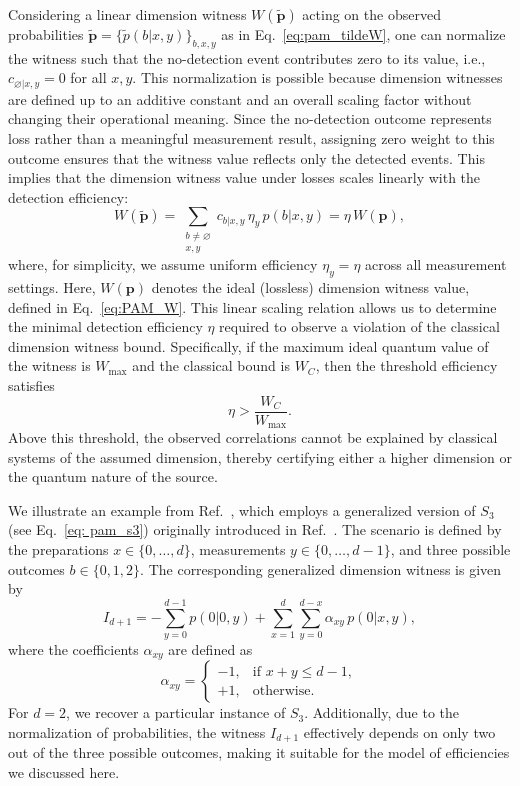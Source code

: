 \documentclass[aps,pra,reprint, superscriptaddress,showkeys]{revtex4-2}
\theoremstyle{plain}
\begin{document}
Considering a linear dimension witness \(W(\mathbf{\tilde{p}})\) acting on the observed probabilities \(\mathbf{\tilde{p}} = \{\tilde{p}(b|x,y)\}_{b,x,y}\) as in Eq.~\eqref{eq:pam_tildeW}, one can normalize the witness such that the no-detection event contributes zero to its value, i.e., \(c_{\varnothing|x,y} = 0\) for all \(x,y\). This normalization is possible because dimension witnesses are defined up to an additive constant and an overall scaling factor without changing their operational meaning. Since the no-detection outcome represents loss rather than a meaningful measurement result, assigning zero weight to this outcome ensures that the witness value reflects only the detected events. This implies that the dimension witness value under losses scales linearly with the detection efficiency:
\begin{equation}
    W(\mathbf{\tilde{p}}) = \sum_{\substack{b \neq \varnothing \\ x,y}} c_{b|x,y} \, \eta_y \, p(b|x,y) = \eta\, W(\mathbf{p}),
\end{equation}
where, for simplicity, we assume uniform efficiency \(\eta_y = \eta\) across all measurement settings. Here, \(W(\mathbf{p})\) denotes the ideal (lossless) dimension witness value, defined in Eq.~\eqref{eq:PAM_W}. This linear scaling relation allows us to determine the minimal detection efficiency \(\eta\) required to observe a violation of the classical dimension witness bound. Specifically, if the maximum ideal quantum value of the witness is \(W_{\max}\) and the classical bound is \(W_C\), then the threshold efficiency satisfies
\begin{equation}
    \eta > \frac{W_C}{W_{\max}}.
\end{equation}
Above this threshold, the observed correlations cannot be explained by classical systems of the assumed dimension, thereby certifying either a higher dimension or the quantum nature of the source.

We illustrate an example from Ref.~\cite{dallarno2012}, which employs a generalized version of \(S_3\) (see Eq.~\eqref{eq: pam_s3}) originally introduced in Ref.~\cite{gallego2010}. The scenario is defined by the preparations \(x \in \{0, \dots, d\}\), measurements \(y \in \{0, \dots, d{-}1\}\), and three possible outcomes \(b \in \{0,1,2\}\). The corresponding generalized dimension witness is given by
\begin{equation}
    I_{d+1} = -\sum_{y=0}^{d-1} p(0|0,y) + \sum_{x=1}^{d} \sum_{y=0}^{d-x} \alpha_{xy} \, p(0|x,y),
\end{equation}
where the coefficients \(\alpha_{xy}\) are defined as
\begin{equation}
    \alpha_{xy} =
    \begin{cases}
        -1, & \text{if } x + y \leq d - 1, \\
        +1, & \text{otherwise}.
    \end{cases}
\end{equation}
For \(d = 2\), we recover a particular instance of \(S_3\). Additionally, due to the normalization of probabilities, the witness \( I_{d+1} \) effectively depends on only two out of the three possible outcomes, making it suitable for the model of efficiencies we discussed here. 
\end{document}
